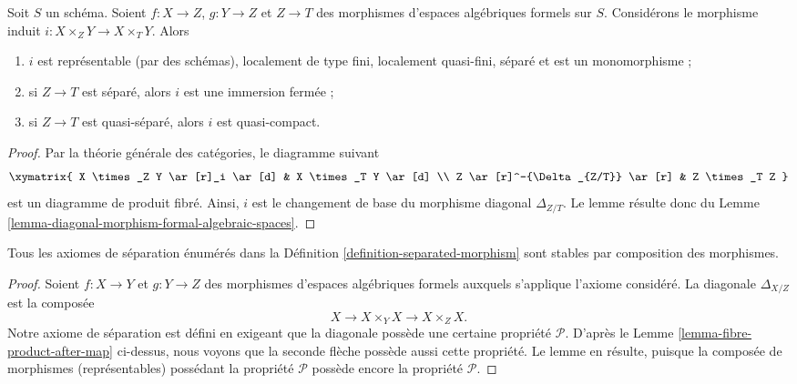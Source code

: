 \begin{lemma}
\label{lemma-fibre-product-after-map}
Soit $S$ un schéma. Soient $f : X \to Z$, $g : Y \to Z$ et $Z \to T$
des morphismes d'espaces algébriques formels sur $S$. Considérons le
morphisme induit $i : X \times_Z Y \to X \times_T Y$. Alors
\begin{enumerate}
\item $i$ est représentable (par des schémas), localement de type fini,
localement quasi-fini, séparé et est un monomorphisme ;
\item si $Z \to T$ est séparé, alors $i$ est une immersion fermée ;
\item si $Z \to T$ est quasi-séparé, alors $i$ est quasi-compact.
\end{enumerate}
\end{lemma}

\begin{proof}
Par la théorie générale des catégories, le diagramme suivant
$$
\xymatrix{
X \times_Z Y \ar[r]_i \ar[d] & X \times_T Y \ar[d] \\
Z \ar[r]^-{\Delta_{Z/T}} \ar[r] & Z \times_T Z
}
$$
est un diagramme de produit fibré. Ainsi, $i$ est le changement de base du
morphisme diagonal $\Delta_{Z/T}$. Le lemme résulte donc
du Lemme \ref{lemma-diagonal-morphism-formal-algebraic-spaces}.
\end{proof}

\begin{lemma}
\label{lemma-composition-separated}
Tous les axiomes de séparation énumérés dans la
Définition \ref{definition-separated-morphism}
sont stables par composition des morphismes.
\end{lemma}

\begin{proof}
Soient $f : X \to Y$ et $g : Y \to Z$ des morphismes d'espaces algébriques formels
auxquels s'applique l'axiome considéré.
La diagonale $\Delta_{X/Z}$ est la composée
$$
X \longrightarrow X \times_Y X \longrightarrow X \times_Z X.
$$
Notre axiome de séparation est défini en exigeant que la diagonale
possède une certaine propriété $\mathcal{P}$. D'après le
Lemme \ref{lemma-fibre-product-after-map} ci-dessus, nous voyons que
la seconde flèche possède aussi cette propriété. Le lemme en résulte,
puisque la composée de morphismes (représentables) possédant la propriété
$\mathcal{P}$ possède encore la propriété $\mathcal{P}$.
\end{proof}

